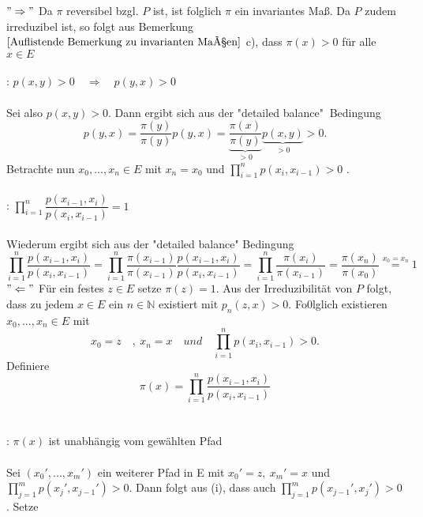 $"\Rightarrow"$ Da $\pi$ reversibel bzgl. $P$ ist, ist folglich $\pi$ ein invariantes Maß. Da $P$ zudem irreduzibel ist, so folgt aus Bemerkung $\ref{Auflistende Bemerkung zu invarianten Maßen}$ c), dass $\pi(x) > 0$ für alle $x \in E$
\\
\\
: $p(x,y)>0 \quad \Rightarrow \quad p(y,x)>0$
\\
\\
Sei also $p(x,y)>0$. Dann ergibt sich aus der "detailed balance"   $\:$Bedingung
\begin{equation*}
p(y,x) = \dfrac{\pi(y)}{\pi(y)} p(y,x) = \underbrace{\dfrac{\pi(x)}{\pi(y)}}_{>0} \underbrace{p(x,y)}_{>0} > 0.
\end{equation*}
Betrachte nun $x_{0},...,x_{n} \in E$ mit $x_{n} = x_{0}$ und  $\prod_{i=1}^{n} p(x_{i},x_{i-1})>0$ .
\\
\\
: $\prod_{i=1}^{n} \dfrac{p(x_{i-1},x_{i})}{p(x_{i},x_{i-1})} = 1$
\\
\\
Wiederum ergibt sich aus der "detailed balance" Bedingung
\begin{equation*}
\prod_{i=1}^{n} \dfrac{p(x_{i-1},x_{i})}{p(x_{i},x_{i-1})} = \prod_{i=1}^{n} \dfrac{\pi(x_{i-1})}{\pi(x_{i-1})} \dfrac{p(x_{i-1},x_{i})}{p(x_{i},x_{i-1})} = \prod_{i=1}^{n} \dfrac{\pi(x_{i})}{\pi(x_{i-1})} = \dfrac{\pi(x_{n})}{\pi(x_{0})} \stackrel{x_{0} = x_{n}}{=} 1
\end{equation*}
$"\Leftarrow"$ Für ein festes $z \in E$ setze $\pi(z) = 1$. Aus der Irreduzibilität von $P$ folgt, dass zu jedem $x \in E$ ein $n \in \mathbb{N}$ existiert mit $p_{n}(z,x) > 0$. Fo0lglich existieren $x_{0},...,x_{n} \in E$ mit
\begin{equation*}
x_{0} = z \quad, \: x_{n} = x \quad und  \quad \prod_{i=1}^{n} p(x_{i},x_{i-1})>0.
\end{equation*}
Definiere
\begin{equation*}
\pi(x) = \prod_{i=1}^{n} \dfrac{p(x_{i-1},x_{i})}{p(x_{i},x_{i-1})}
\end{equation*}
\\
\\
: $\pi(x)$ ist unabhängig vom gewählten Pfad
\\
\\
Sei $(x_{0}',...,x_{m}')$ ein weiterer Pfad in E mit $x_{0}' = z, \: x_{m}' = x$ und $\prod_{j=1}^{m} p(x_{j}',x_{j-1}')>0$. Dann folgt aus (i), dass auch $\prod_{j=1}^{m} p(x_{j-1}',x_{j}')>0$. Setze
